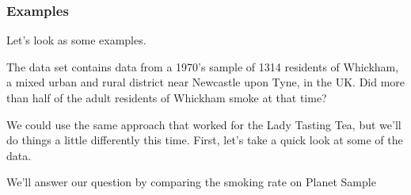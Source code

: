 \subsubsection{Examples}
Let's look as some examples.

\begin{example}
The  data set contains data from a 1970's sample of 1314
residents of Whickham,  a mixed urban and rural district near Newcastle upon Tyne, in the UK.
Did more than half of the adult residents of Whickham smoke at that time?

We could use the same approach that worked for the Lady Tasting Tea, but we'll do things 
a little differently this time.  First, let's take a quick look at some of the data.
\begin{knitrout}
\end{knitrout}

We'll answer our question by comparing the smoking rate on Planet Sample 
\begin{knitrout}
\end{knitrout}


\end{example}

